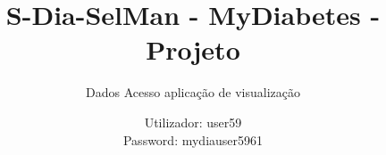 \documentclass[handout]{beamer}
\title{S-Dia-SelMan - MyDiabetes - Projeto}
\subtitle{Dados Acesso aplicação de visualização}
\author{Utilizador: user59\\
Password: mydiauser5961}
\date{}
\institute{\url{mydiabetes@dcc.fc.up.pt}\\\url{http://mydiabetes.dcc.fc.up.pt/}}
\begin{document}
\begin{frame}[plain,t]
\titlepage
\end{frame}
\end{document}
